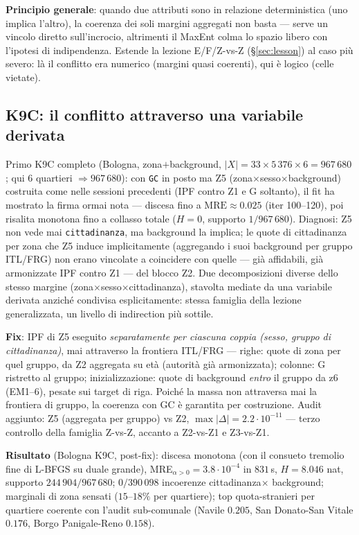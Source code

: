 \documentclass[11pt,a4paper]{article}
\newcommand{\code}[1]{\texttt{#1}}
\begin{document}
\medskip\noindent\textbf{Principio generale}: quando due attributi sono
in relazione deterministica (uno implica l'altro), la coerenza dei soli
margini aggregati non basta --- serve un vincolo diretto sull'incrocio,
altrimenti il MaxEnt colma lo spazio libero con l'ipotesi di
indipendenza. Estende la lezione E/F/Z-vs-Z (\S\ref{sec:lesson}) al caso
pi\`u severo: l\`a il conflitto era numerico (margini quasi coerenti), qui
\`e logico (celle vietate).

\subsection{K9C: il conflitto attraverso una variabile derivata}
\label{sec:bug-z5}
Primo K9C completo (Bologna, zona$+$background,
$|X|=33\times5\,376\times6=967\,680$; qui $6$ quartieri
$\Rightarrow 967\,680$): con \code{GC} in posto ma Z5
(zona$\times$sesso$\times$background) costruita come nelle sessioni
precedenti (IPF contro Z1 e G soltanto), il fit ha mostrato la firma
ormai nota --- discesa fino a $\text{MRE}\approx0.025$ (iter 100--120),
poi risalita monotona fino a collasso totale ($H=0$, supporto
$1/967\,680$). Diagnosi: Z5 non vede mai \code{cittadinanza}, ma
background la implica; le quote di cittadinanza per zona che Z5 induce
implicitamente (aggregando i suoi background per gruppo ITL/FRG) non
erano vincolate a coincidere con quelle --- gi\`a affidabili, gi\`a
armonizzate IPF contro Z1 --- del blocco Z2. Due decomposizioni diverse
dello stesso margine (zona$\times$sesso$\times$cittadinanza), stavolta
mediate da una variabile derivata anzich\'e condivisa esplicitamente:
stessa famiglia della lezione generalizzata, un livello di indirection
pi\`u sottile.

\medskip\noindent\textbf{Fix}: IPF di Z5 eseguito \emph{separatamente per
ciascuna coppia (sesso, gruppo di cittadinanza)}, mai attraverso la
frontiera ITL/FRG --- righe: quote di zona per quel gruppo, da Z2
aggregata su et\`a (autorit\`a gi\`a armonizzata); colonne: G ristretto
al gruppo; inizializzazione: quote di background \emph{entro} il gruppo
da z6 (EM1--6), pesate sui target di riga. Poich\'e la massa non
attraversa mai la frontiera di gruppo, la coerenza con GC \`e garantita
per costruzione. Audit aggiunto: Z5 (aggregata per gruppo)
vs Z2, $\max|\Delta|=2.2\cdot10^{-11}$ --- terzo controllo della famiglia
Z-vs-Z, accanto a Z2-vs-Z1 e Z3-vs-Z1.

\medskip\noindent\textbf{Risultato} (Bologna K9C, post-fix): discesa
monotona (con il consueto tremolio fine di L-BFGS su duale grande),
MRE$_{\alpha>0}=3.8\cdot10^{-4}$ in $831$\,s, $H=8.046$ nat, supporto
$244\,904/967\,680$; $0/390\,098$ incoerenze cittadinanza$\times$
background; marginali di zona sensati ($15$--$18\%$ per quartiere);
top quota-stranieri per quartiere coerente con l'audit sub-comunale
(Navile $0.205$, San Donato-San Vitale $0.176$, Borgo Panigale-Reno
$0.158$).
\end{document}
